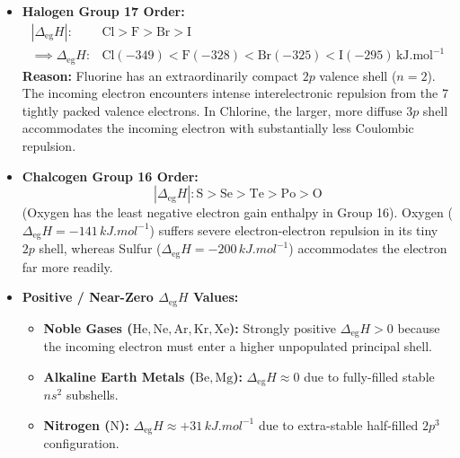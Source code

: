 \documentclass[10pt,twoside,openright]{book}
\begin{document}
\begin{trapbox}
\begin{itemize}
  \item \textbf{Halogen Group 17 Order:}
  \begin{align}
    |\Delta_{\text{eg}} H|: &\mathbf{\mathrm{Cl > F > Br > I}} \\
    \implies \Delta_{\text{eg}} H: &\mathrm{Cl (-349) < F (-328) < Br (-325) < I (-295)\,\si{kJ.mol^{-1}}}
  \end{align}
  \textbf{Reason:} Fluorine has an extraordinarily compact $2p$ valence shell ($n=2$). The incoming electron encounters intense interelectronic repulsion from the 7 tightly packed valence electrons. In Chlorine, the larger, more diffuse $3p$ shell accommodates the incoming electron with substantially less Coulombic repulsion.
  \item \textbf{Chalcogen Group 16 Order:}
  \begin{equation}
    |\Delta_{\text{eg}} H|: \mathbf{\mathrm{S > Se > Te > Po > O}}
  \end{equation}
  (Oxygen has the least negative electron gain enthalpy in Group 16).
  Oxygen ($\Delta_{\text{eg}} H = -141\,\si{kJ.mol^{-1}}$) suffers severe electron-electron repulsion in its tiny $2p$ shell, whereas Sulfur ($\Delta_{\text{eg}} H = -200\,\si{kJ.mol^{-1}}$) accommodates the electron far more readily.
  \item \textbf{Positive / Near-Zero $\Delta_{\text{eg}} H$ Values:}
  \begin{itemize}
    \item \textbf{Noble Gases ($\mathrm{He, Ne, Ar, Kr, Xe}$):} Strongly positive $\Delta_{\text{eg}} H > 0$ because the incoming electron must enter a higher unpopulated principal shell.
    \item \textbf{Alkaline Earth Metals ($\mathrm{Be, Mg}$):} $\Delta_{\text{eg}} H \approx 0$ due to fully-filled stable $ns^2$ subshells.
    \item \textbf{Nitrogen ($\mathrm{N}$):} $\Delta_{\text{eg}} H \approx +31\,\si{kJ.mol^{-1}}$ due to extra-stable half-filled $2p^3$ configuration.
  \end{itemize}
\end{itemize}
\end{trapbox}
\end{document}
